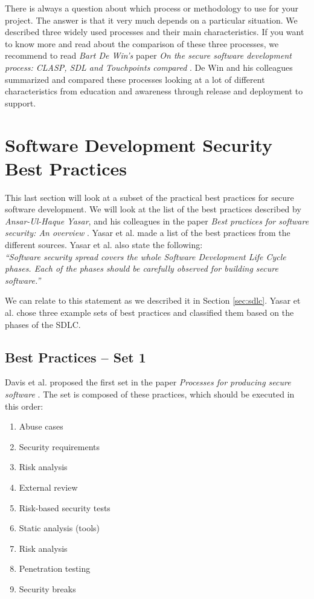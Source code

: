 \documentclass[12pt,a4,twoside]{article}
\begin{document}
There is always a question about which process or methodology to use for your project. The answer is that it very much depends on a particular situation. We described three widely used processes and their main characteristics. If you want to know more and read about the comparison of these three processes, we recommend to read \textit{Bart De Win's} paper \textit{On the secure software development process: CLASP, SDL and Touchpoints compared} \cite{on_secure_software}. De Win and his colleagues summarized and compared these processes looking at a lot of different characteristics from education and awareness through release and deployment to support.

\section{Software Development Security Best Practices}
\label{sec:best_practices}

This last section will look at a subset of the practical best practices for secure software development. We will look at the list of the best practices described by \textit{Ansar-Ul-Haque Yasar}, and his colleagues in the paper \textit{Best practices for software security: An overview} \cite{security_best_practices}. Yasar et al. made a list of the best practices from the different sources. Yasar et al. also state the following:\\

\textit{``Software security spread covers the whole Software Development Life Cycle phases. Each of the phases should be carefully observed for building secure software.''\\}

We can relate to this statement as we described it in Section \ref{sec:sdlc}. Yasar et al. chose three example sets of best practices and classified them based on the phases of the SDLC.

\subsection{Best Practices -- Set 1}

Davis et al. proposed the first set in the paper \textit{Processes for producing secure software} \cite{davis_secure_software}. The set is composed of these practices, which should be executed in this order:

\begin{enumerate}[noitemsep]
    \item Abuse cases
    \item Security requirements
    \item Risk analysis
    \item External review
    \item Risk-based security tests
    \item Static analysis (tools)
    \item Risk analysis
    \item Penetration testing
    \item Security breaks
\end{enumerate}
\end{document}
